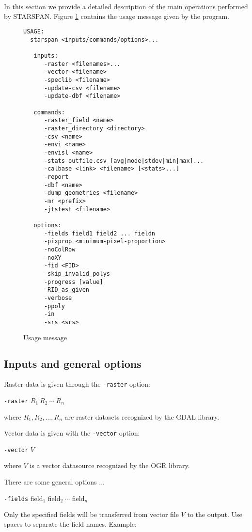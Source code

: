 \documentclass{elsart}
\begin{document}
In this section we provide a detailed description of the main operations
performed by STARSPAN. 
Figure \ref{fig-usage} contains the usage message given by the program.
\begin{figure}[!ht]
\centering
\scriptsize{
\begin{verbatim}
USAGE:
  starspan <inputs/commands/options>...

   inputs:
      -raster <filenames>...
      -vector <filename>
      -speclib <filename>
      -update-csv <filename>
      -update-dbf <filename>

   commands:
      -raster_field <name>
      -raster_directory <directory>
      -csv <name>
      -envi <name>
      -envisl <name>
      -stats outfile.csv [avg|mode|stdev|min|max]...
      -calbase <link> <filename> [<stats>...]
      -report
      -dbf <name>
      -dump_geometries <filename>
      -mr <prefix>
      -jtstest <filename>

   options:
      -fields field1 field2 ... fieldn
      -pixprop <minimum-pixel-proportion>
      -noColRow
      -noXY
      -fid <FID>
      -skip_invalid_polys
      -progress [value]
      -RID_as_given
      -verbose
      -ppoly
      -in
      -srs <srs>
\end{verbatim}
}
\label{fig-usage}
\caption{Usage message}
\end{figure}

\subsection{Inputs and general options}

Raster data is given through the \verb|-raster| option:

	\verb|-raster| $R_1\ R_2\ \cdots\ R_n$

where $R_1, R_2, \ldots, R_n$ are raster datasets recognized by the GDAL library.

Vector data is given with the \verb|-vector| option:
	
	\verb|-vector| $V$

where $V$ is a vector datasource recognized by the OGR library.

There are some general options ...

	\verb|-fields| field$_1$ field$_2\ \cdots$ field$_n$
	
Only the specified fields will be transferred from vector file $V$
to the output. Use spaces to separate the field names.  Example:
\end{document}
